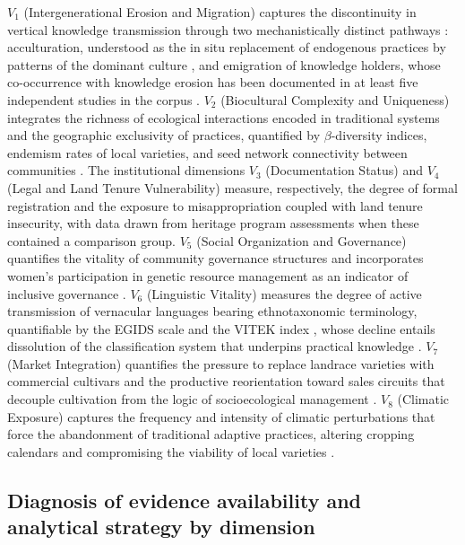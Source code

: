 \documentclass[12pt,a4paper]{article}
\begin{document}
$V_1$ (Intergenerational Erosion and Migration) captures the discontinuity in vertical knowledge transmission through two mechanistically distinct pathways \citep{ReyesGarcia2013}: acculturation, understood as the in situ replacement of endogenous practices by patterns of the dominant culture \citep{GomezBaggethun2013}, and emigration of knowledge holders, whose co-occurrence with knowledge erosion has been documented in at least five independent studies in the corpus \citep{Tran2025,Moller2023,Bastos2022,VazquezDelfin2022,Aniah2019}. $V_2$ (Biocultural Complexity and Uniqueness) integrates the richness of ecological interactions encoded in traditional systems \citep{Jarvis2008,Brush2004} and the geographic exclusivity of practices, quantified by $\beta$-diversity indices, endemism rates of local varieties, and seed network connectivity between communities \citep{Sibanda2025}. The institutional dimensions $V_3$ (Documentation Status) and $V_4$ (Legal and Land Tenure Vulnerability) measure, respectively, the degree of formal registration and the exposure to misappropriation coupled with land tenure insecurity, with data drawn from heritage program assessments when these contained a comparison group. $V_5$ (Social Organization and Governance) quantifies the vitality of community governance structures \citep{Ostrom1990,Pretty2003} and incorporates women's participation in genetic resource management as an indicator of inclusive governance \citep{Sibanda2025,RomeroSilva2026,MugiNgenga2016}. $V_6$ (Linguistic Vitality) measures the degree of active transmission of vernacular languages bearing ethnotaxonomic terminology, quantifiable by the EGIDS scale \citep{LewisSimons2010} and the VITEK index \citep{ZentMaffi2009}, whose decline entails dissolution of the classification system that underpins practical knowledge \citep{CamaraLeret2021}. $V_7$ (Market Integration) quantifies the pressure to replace landrace varieties with commercial cultivars and the productive reorientation toward sales circuits that decouple cultivation from the logic of socioecological management \citep{Godoy2005,ReyesGarcia2013}. $V_8$ (Climatic Exposure) captures the frequency and intensity of climatic perturbations that force the abandonment of traditional adaptive practices, altering cropping calendars and compromising the viability of local varieties \citep{Savo2016}.

\subsection{Diagnosis of evidence availability and analytical strategy by dimension}
\label{sec:diagnosis}
\end{document}
